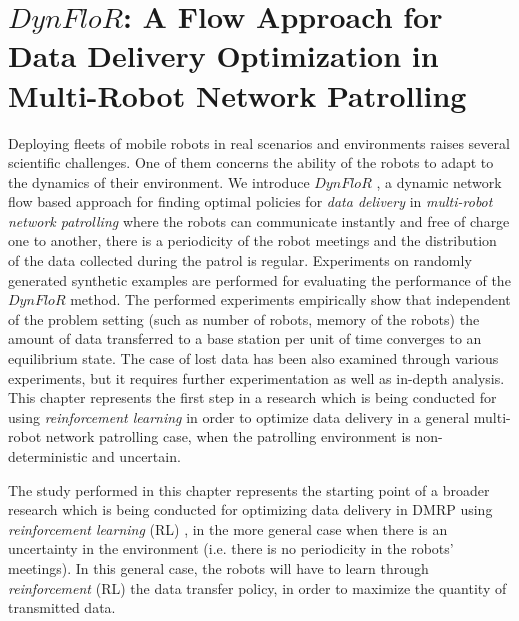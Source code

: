 \chapter[A Flow Approach for Data Delivery Optimization]{$\mathit{DynFloR}$: A Flow Approach for Data Delivery Optimization in Multi-Robot Network Patrolling}
\label{flow}

Deploying fleets of mobile robots in real scenarios and environments raises several scientific challenges. One of them concerns the ability of the robots to adapt to the dynamics of their environment. We introduce $\mathit{DynFloR}$ \cite{kes}, a dynamic network flow based approach for finding optimal policies for \emph{data delivery} in \emph{multi-robot network patrolling} where the robots can communicate instantly and free of charge one to another, there is a periodicity of the robot meetings and the distribution of the data collected during the patrol is regular. Experiments on randomly generated synthetic examples are performed for evaluating the performance of the $\mathit{DynFloR}$ method. The performed experiments empirically show that independent of the problem setting (such as number of robots, memory of the robots) the amount of data transferred to a base station per unit of time converges to an equilibrium state. The case of lost data has been also examined through various experiments, but it requires further experimentation as well as in-depth analysis. This chapter represents the first step in a research which is being conducted for using \emph{reinforcement learning} in order to optimize data delivery in a general multi-robot network patrolling case, when the patrolling environment is non-deterministic and uncertain.

The study performed  in this chapter represents the starting point of a broader research which is being conducted for optimizing data delivery in DMRP using \emph{reinforcement learning} (RL) \cite{AsisHHS18}, in the more general case when there is an uncertainty in the environment (i.e. there is no periodicity in the robots' meetings). In this general case, the robots will have to learn through \emph{reinforcement} (RL) \cite{Konidaris12} the data transfer policy, in order to maximize the quantity of transmitted data.
 
